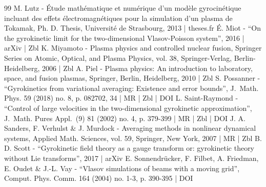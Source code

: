 \documentclass[10pt]{amsart}
\theoremstyle{plain}
\theoremstyle{definition}
\begin{document}
\begin{thebibliography}{99}
M. Lutz - Étude mathématique et numérique d’un modèle gyrocinétique incluant des effets électromagnétiques pour la simulation d’un plasma de Tokamak, Ph. D. Thesis, Université de Strasbourg, 2013 | theses.fr
É. Miot - “On the gyrokinetic limit for the two-dimensional Vlasov-Poisson system”, 2016 | arXiv | Zbl
K. Miyamoto - Plasma physics and controlled nuclear fusion, Springer Series on Atomic, Optical, and Plasma Physics, vol. 38, Springer-Verlag, Berlin-Heidelberg, 2006 | Zbl
A. Piel - Plasma physics: An introduction to laboratory, space, and fusion plasmas, Springer, Berlin, Heidelberg, 2010 | Zbl
S. Possanner - “Gyrokinetics from variational averaging: Existence and error bounds”, J. Math. Phys. 59 (2018) no. 8, p. 082702, 34 | MR | Zbl | DOI
L. Saint-Raymond - “Control of large velocities in the two-dimensional gyrokinetic approximation”, J. Math. Pures Appl. (9) 81 (2002) no. 4, p. 379-399 | MR | Zbl | DOI
J. A. Sanders, F. Verhulst \& J. Murdock - Averaging methods in nonlinear dynamical systems, Applied Math. Sciences, vol. 59, Springer, New York, 2007 | MR | Zbl
B. D. Scott - “Gyrokinetic field theory as a gauge transform or: gyrokinetic theory without Lie transforms”, 2017 | arXiv
E. Sonnendrücker, F. Filbet, A. Friedman, E. Oudet \& J.-L. Vay - “Vlasov simulations of beams with a moving grid”, Comput. Phys. Comm. 164 (2004) no. 1-3, p. 390-395 | DOI
\end{thebibliography}
\end{document}
